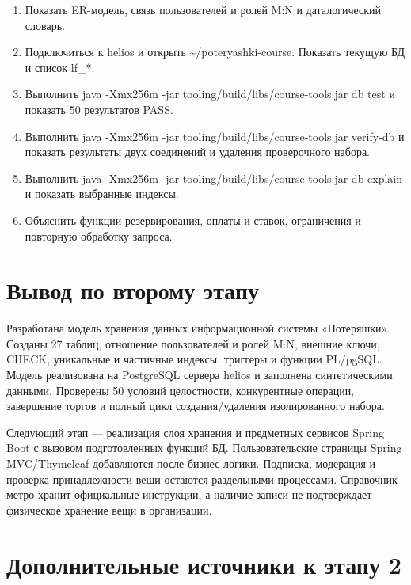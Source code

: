 \begin{enumerate}
\item Показать ER-модель, связь пользователей и ролей M:N и даталогический словарь.
\item Подключиться к helios и открыть \textasciitilde{}/\allowbreak{}poteryashki-course. Показать текущую БД и список lf\_\allowbreak{}*.
\item Выполнить java -Xmx256m -jar tooling/\allowbreak{}build/\allowbreak{}libs/\allowbreak{}course-tools.jar db test и показать 50 результатов PASS.
\item Выполнить java -Xmx256m -jar tooling/\allowbreak{}build/\allowbreak{}libs/\allowbreak{}course-tools.jar verify-db и показать результаты двух соединений и удаления проверочного набора.
\item Выполнить java -Xmx256m -jar tooling/\allowbreak{}build/\allowbreak{}libs/\allowbreak{}course-tools.jar db explain и показать выбранные индексы.
\item Объяснить функции резервирования, оплаты и ставок, ограничения и повторную обработку запроса.
\end{enumerate}

\clearpage
\section{Вывод по второму этапу}

Разработана модель хранения данных информационной системы «Потеряшки». Созданы 27 таблиц, отношение пользователей и ролей M:N, внешние ключи, CHECK, уникальные и частичные индексы, триггеры и функции PL/\allowbreak{}pg\allowbreak{}SQL. Модель реализована на Postgre\allowbreak{}SQL сервера helios и заполнена синтетическими данными. Проверены 50 условий целостности, конкурентные операции, завершение торгов и полный цикл создания/\allowbreak{}удаления изолированного набора.

Следующий этап — реализация слоя хранения и предметных сервисов Spring Boot с вызовом подготовленных функций БД. Пользовательские страницы Spring MVC/\allowbreak{}Thymeleaf добавляются после бизнес-логики. Подписка, модерация и проверка принадлежности вещи остаются раздельными процессами. Справочник метро хранит официальные инструкции, а наличие записи не подтверждает физическое хранение вещи в организации.

\clearpage
\section*{Дополнительные источники к этапу 2}
{}

